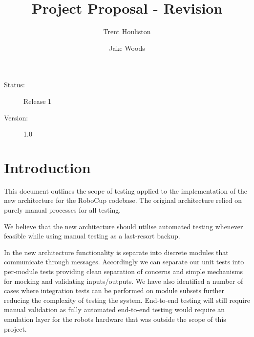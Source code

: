 \documentclass[english,12pt]{scrartcl}
\title{Project Proposal - Revision}
\author{Trent Houliston \and Jake Woods}
\begin{document}
	\maketitle
	\vfill
	{\large
		\begin{description}
			\item [Status:] Release 1
			\item [Version:] 1.0
		\end{description}}

	\clearpage
	\tableofcontents
	\clearpage

\section{Introduction}
	This document outlines the scope of testing applied to the implementation of the new architecture for the RoboCup codebase. 
	The original architecture relied on purely manual processes for all testing.
	 
	We believe that the new architecture should utilise automated testing whenever feasible while using manual testing as a last-resort backup.
	
	In the new architecture functionality is separate into discrete modules that communicate through messages. 
	Accordingly we can separate our unit tests into per-module tests providing clean separation of concerns and simple mechanisms for mocking and validating inputs/outputs.
	We have also identified a number of cases where integration tests can be performed on module subsets further reducing the complexity of testing the system.
	End-to-end testing will still require manual validation as fully automated end-to-end testing would require an emulation layer for the robots hardware that was outside the scope of this project.
\end{document}
